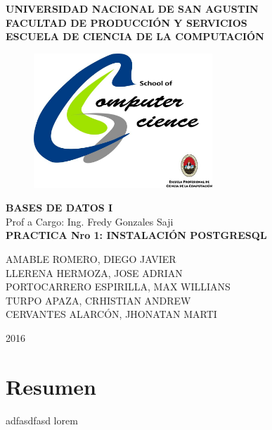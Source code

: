 \documentclass[10pt, a4paper]{article}
\begin{document}
\thispagestyle{empty}
\begin{center}
\Large
\textbf{
UNIVERSIDAD NACIONAL DE SAN AGUSTIN\\
FACULTAD DE PRODUCCIÓN Y SERVICIOS\\
ESCUELA DE CIENCIA DE LA COMPUTACIÓN\\}

\vspace{1.5cm}
\begin{figure}[hb]
	\centering
	\includegraphics[width=0.6\textwidth]{jpg/logoCS_UNSA.jpg}
\end{figure}

\textbf{BASES DE DATOS I\\}
Prof a Cargo: Ing. Fredy Gonzales Saji\\
\vspace{1cm}
\textbf{PRACTICA Nro 1: INSTALACIÓN POSTGRESQL}

\vspace{2cm}

AMABLE ROMERO, DIEGO JAVIER\\
LLERENA HERMOZA, JOSE ADRIAN\\
PORTOCARRERO ESPIRILLA, MAX WILLIANS\\
TURPO APAZA, CRHISTIAN ANDREW\\
CERVANTES ALARCÓN, JHONATAN MARTI\\

\vfill

2016
\end{center}

\newpage
\thispagestyle{empty}

\section{Resumen}
\paragraph{}
adfasdfasd lorem
\end{document}
